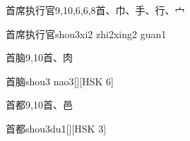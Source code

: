 \begin{entry}{首席执行官}{9,10,6,6,8}{⾸、⼱、⼿、⾏、⼧}
  \begin{phonetics}{首席执行官}{shou3xi2 zhi2xing2 guan1}
  \end{phonetics}
\end{entry}

\begin{entry}{首脑}{9,10}{⾸、⾁}
  \begin{phonetics}{首脑}{shou3 nao3}[][HSK 6]
  \end{phonetics}
\end{entry}

\begin{entry}{首都}{9,10}{⾸、⾢}
  \begin{phonetics}{首都}{shou3du1}[][HSK 3]
  \end{phonetics}
\end{entry}


